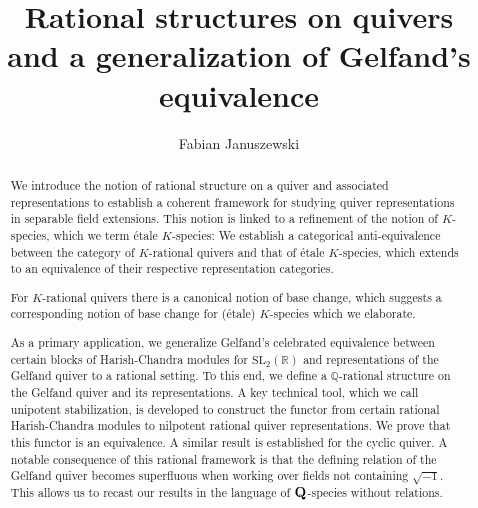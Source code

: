 \documentclass[a4paper,12pt,reqno]{amsart}
\newcommand{\QQ}{{\rm\bf Q}}
\theoremstyle{plain}
\theoremstyle{remark}
\begin{document}
    \title{Rational structures on quivers\\and a generalization of Gelfand's equivalence}

    \author{Fabian Januszewski}
    \address{Institut f\"ur Mathematik, Fakult\"at EIM, Paderborn University, Warburger Str.\ 100, 33098 Paderborn, Germany}

    \begin{abstract}
      We introduce the notion of rational structure on a quiver and associated representations to establish a coherent framework for studying quiver representations in separable field extensions. This notion is linked to a refinement of the notion of $K$-species, which we term \'etale $K$-species: We establish a categorical anti-equivalence between the category of $K$-rational quivers and that of \'etale $K$-species, which extends to an equivalence of their respective representation categories.

      For $K$-rational quivers there is a canonical notion of base change, which suggests a corresponding notion of base change for (\'etale) $K$-species which we elaborate.

      As a primary application, we generalize Gelfand's celebrated equivalence between certain blocks of Harish-Chandra modules for $\mathrm{SL}_2(\mathbb{R})$ and representations of the Gelfand quiver to a rational setting. To this end, we define a $\mathbb{Q}$-rational structure on the Gelfand quiver and its representations. A key technical tool, which we call unipotent stabilization, is developed to construct the functor from certain rational Harish-Chandra modules to nilpotent rational quiver representations. We prove that this functor is an equivalence. A similar result is established for the cyclic quiver. A notable consequence of this rational framework is that the defining relation of the Gelfand quiver becomes superfluous when working over fields not containing $\sqrt{-1}$. This allows us to recast our results in the language of $\QQ$-species without relations.
    \end{abstract}

    \maketitle

    {\tiny
      \tableofcontents
    }

\end{document}

